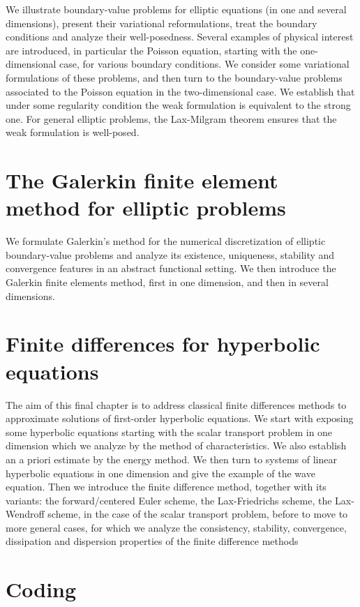 \documentclass{article}
\begin{document}
We illustrate boundary-value problems for elliptic equations (in one and
several dimensions), present their variational reformulations, treat the
boundary conditions and analyze their well-posedness. Several examples of
physical interest are introduced, in particular the Poisson equation, starting
with the one-dimensional case, for various boundary conditions. We consider
some variational formulations of these problems, and then turn to the
boundary-value problems associated to the Poisson equation in the
two-dimensional case. We establish that under some regularity condition the
weak formulation is equivalent to the strong one. For general elliptic
problems, the Lax-Milgram theorem  ensures that the weak formulation is
well-posed. 

\section{The Galerkin finite element method for elliptic problems}

We formulate Galerkin’s method for the numerical discretization of elliptic
boundary-value problems and analyze its existence, uniqueness, stability and
convergence features  in an abstract functional setting. We then introduce the
Galerkin finite elements method, first in one dimension,  and then in several
dimensions.

\section{Finite differences for hyperbolic equations}

The aim of this final chapter is to address classical finite differences
methods to  approximate solutions of first-order hyperbolic equations. We
start with exposing some hyperbolic equations starting with the scalar
transport problem in one dimension which we analyze by the method of
characteristics. We also establish an a priori estimate by the energy method.
We then turn to systems of linear hyperbolic equations in one dimension and
give the example of  the wave equation. Then we introduce the finite
difference method, together with its variants: the forward/centered Euler
scheme, the Lax-Friedrichs scheme, the Lax-Wendroff scheme, in the case of the
scalar transport problem, before to move to more general cases, for which we
analyze the consistency, stability, convergence, dissipation and dispersion
properties of the finite difference methods 

\section{Coding}



\end{document}
